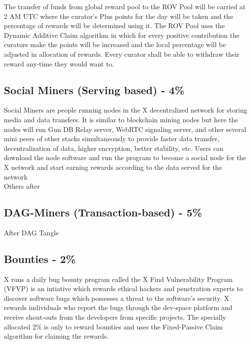 \documentclass[letterpaper,11pt]{article}
\begin{document}
The transfer of funds from global reward pool to the ROV Pool will be carried at 2 AM UTC where the curator's Plus points for the day will be taken and the percentage of rewards will be determined using it. The ROV Pool uses the  Dynamic Additive Claim algorithm in which for every positive contribution the curators make the points will be increased and the local percentage will be adjusted in allocation of rewards. Every curator shall be able to withdraw their reward any-time they would want to.\\

\subsection{\textbf{Social Miners (Serving based) - 4\%}}

Social Miners are people running nodes in the X decentralized network for storing media and data transfers. It is similar to blockchain mining nodes but here the nodes will run Gun DB Relay server, WebRTC signaling server, and other several mini peers of other stacks simultaneously to provide faster data transfer, decentralization of data, higher encryption, better stability, etc. Users can download the node software and run the program to become a social node for the X network and start earning rewards according to the data served for the network\\

Others after\\

\subsection{\textbf{DAG-Miners (Transaction-based) - 5\%}}

After DAG Tangle\\

\subsection{\textbf{Bounties - 2\%}}

X runs a daily bug bounty program called the X Find Vulnerability Program (VFVP) is an intiative which rewards ethical hackers and penetration experts to discover software bugs which possesses a threat to the software's security. X rewards individuals who report the bugs through the dev-space platform and receive shout-outs from the developers from specific projects. The specially allocated 2\% is only to reward bounties and uses the Fixed-Passive Claim algorithm for claiming the rewards. \\
\end{document}
